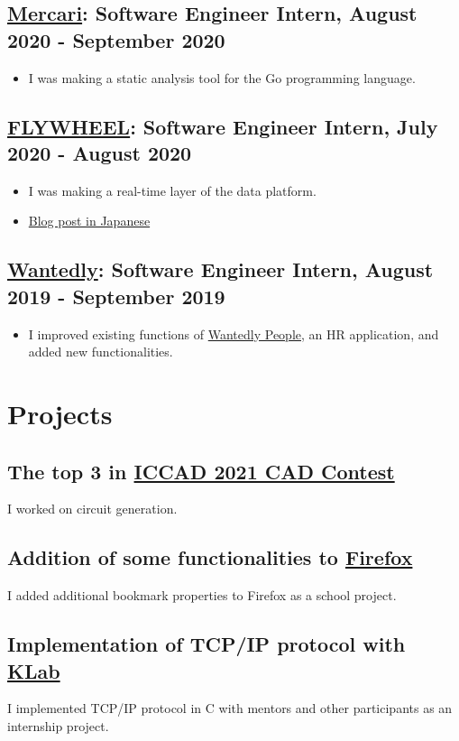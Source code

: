 \documentclass[12pt]{article}
\begin{document}
  \subsection*{\href{https://about.mercari.com/en}{Mercari}: Software Engineer Intern, August 2020 - September 2020}
    \begin{itemize}
      \item I was making a static analysis tool for the Go programming language.
    \end{itemize}
  \subsection*{\href{https://www.flywheel.jp}{FLYWHEEL}: Software Engineer Intern, July 2020 - August 2020}
    \begin{itemize}
      \item I was making a real-time layer of the data platform.
      \item \href{https://www.flywheel.jp/topics/20200917}{Blog post in Japanese}
    \end{itemize}
  \subsection*{\href{https://wantedlyinc.com/ja}{Wantedly}: Software Engineer Intern, August 2019 - September 2019}
    \begin{itemize}
      \item I improved existing functions of \href{https://people.wantedly.com/}{Wantedly People}, an HR application, and added new functionalities.
    \end{itemize}

\section*{Projects}
  \subsection*{The top 3 in \href{http://iccad-contest.org/2021/}{ICCAD 2021 CAD Contest}}
    I worked on circuit generation.
  \subsection*{Addition of some functionalities to \href{https://slides.com/diohabara/deck}{Firefox}}
    I added additional bookmark properties to Firefox as a school project.
  \subsection*{Implementation of TCP/IP protocol with \href{https://www.klab.com/en/}{KLab}}
    I implemented TCP/IP protocol in C with mentors and other participants as an internship project.
\end{document}
